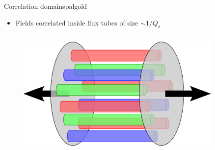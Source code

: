 \documentclass[aspectratio=169,11pt,usenames,dvipsnames]{beamer}
\begin{document}
\begin{frame}
\begin{columns}[onlytextwidth,t]
        \begin{custombox2}{{\normalsize Correlation domains}}{palgold}
            \begin{varwidth}{0.99\columnwidth}
            \begin{itemize}\itemsep0em 
                \scriptsize
                \item Fields correlated inside flux tubes of size $\sim 1/Q_s$ 
            \end{itemize}
            \end{varwidth}
        \end{custombox2}
 
    \end{columns}

    \begin{columns}[onlytextwidth,t]

        \vspace{5pt}
        \begin{center}
            \begin{figure}
                \centering
                \hspace{-5pt}\includegraphics[width=0.9\textwidth]{images/glasma.eps}
            \end{figure}
        \end{center}


\end{columns}
\end{frame}
\end{document}
